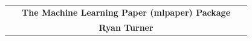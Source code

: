 \documentclass[a0,landscape]{a0poster}
\begin{document}


{
\setlength\extrarowheight{35pt}
\begin{tabular}{P{15cm}cP{15cm}}
&
{\fontsize{100}{120} \selectfont \color{NavyBlue} \textbf{The Machine Learning Paper (mlpaper) Package} \color{Black}}
&
 \\
&
\Huge \textbf{Ryan Turner}
&
\end{tabular}
}

\vspace{7mm} %

\end{document}
